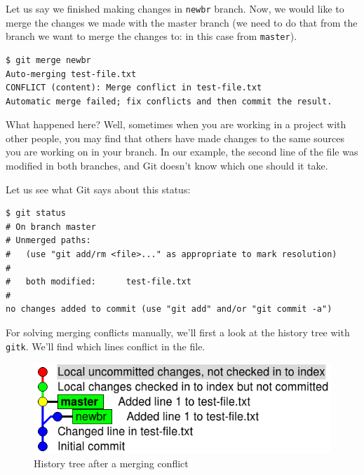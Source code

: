 \documentclass[a4paper,10pt]{article}
\newenvironment{terminal}
  {
    \vspace{+10pt}
    \begin{center}
    \begin{minipage}{0.95\textwidth}
    \begin{framed}
  }
  {
    \end{framed}
    \end{minipage}
    \end{center}
    \vspace{+10pt}
  }
\begin{document}
Let us say we finished making changes in \texttt{newbr} branch. Now, we
would like to merge the changes we made with the master branch (we
need to do that from the branch we want to merge the changes to: in
this case from \texttt{master}).

\begin{terminal}
\begin{verbatim}
$ git merge newbr
Auto-merging test-file.txt
CONFLICT (content): Merge conflict in test-file.txt
Automatic merge failed; fix conflicts and then commit the result.
\end{verbatim}
\end{terminal}

What happened here? Well, sometimes when you are working in a project
with other people, you may find that others have made changes to the
same sources you are working on in your branch. In our example, the
second line of the file was modified in both branches, and Git doesn't
know which one should it take.

Let us see what Git says about this status:

\begin{terminal}
\begin{verbatim}
$ git status
# On branch master
# Unmerged paths:
#   (use "git add/rm <file>..." as appropriate to mark resolution)
#
#	both modified:      test-file.txt
#
no changes added to commit (use "git add" and/or "git commit -a")
\end{verbatim}
\end{terminal}

For solving merging conflicts manually, we'll first a look at the
history tree with \texttt{gitk}. We'll find which lines conflict in
the file.

\begin{figure}[h]
  \begin{center}
    \includegraphics[scale=0.5]{git_example-07}
  \end{center}
  \caption{History tree after a merging conflict}
\end{figure}
\end{document}
